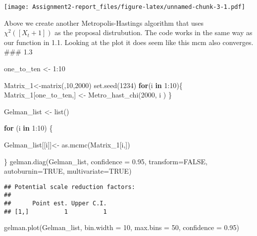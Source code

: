 \documentclass[
]{article}
\newenvironment{Shaded}{\begin{snugshade}}{\end{snugshade}}
\newcommand{\AttributeTok}[1]{\textcolor[rgb]{0.77,0.63,0.00}{#1}}
\newcommand{\ConstantTok}[1]{\textcolor[rgb]{0.00,0.00,0.00}{#1}}
\newcommand{\ControlFlowTok}[1]{\textcolor[rgb]{0.13,0.29,0.53}{\textbf{#1}}}
\newcommand{\DecValTok}[1]{\textcolor[rgb]{0.00,0.00,0.81}{#1}}
\newcommand{\FloatTok}[1]{\textcolor[rgb]{0.00,0.00,0.81}{#1}}
\newcommand{\FunctionTok}[1]{\textcolor[rgb]{0.00,0.00,0.00}{#1}}
\newcommand{\NormalTok}[1]{#1}
\newcommand{\OtherTok}[1]{\textcolor[rgb]{0.56,0.35,0.01}{#1}}
\newcommand{\SpecialCharTok}[1]{\textcolor[rgb]{0.00,0.00,0.00}{#1}}
\begin{document}
\texttt{[image: Assignment2-report\_files/figure-latex/unnamed-chunk-3-1.pdf]}

Above we create another Metropolis-Hastings algorithm that uses
\(\chi^2([X_t+1])\) as the proposal distrubution. The code works in the
same way as our function in 1.1. Looking at the plot it does seem like
this mcm also converges. \#\#\# 1.3

\begin{Shaded}
\begin{Highlighting}[]
\NormalTok{one\_to\_ten }\OtherTok{\textless{}{-}} \DecValTok{1}\SpecialCharTok{:}\DecValTok{10}

\NormalTok{Matrix\_1}\OtherTok{\textless{}{-}}\FunctionTok{matrix}\NormalTok{(,}\DecValTok{10}\NormalTok{,}\DecValTok{2000}\NormalTok{)}
\FunctionTok{set.seed}\NormalTok{(}\DecValTok{1234}\NormalTok{)}
\ControlFlowTok{for}\NormalTok{(i }\ControlFlowTok{in} \DecValTok{1}\SpecialCharTok{:}\DecValTok{10}\NormalTok{)\{}
\NormalTok{  Matrix\_1[one\_to\_ten,] }\OtherTok{\textless{}{-}} \FunctionTok{Metro\_hast\_chi}\NormalTok{(}\DecValTok{2000}\NormalTok{, i )}
\NormalTok{\}}

\NormalTok{Gelman\_list }\OtherTok{\textless{}{-}} \FunctionTok{list}\NormalTok{()}

\ControlFlowTok{for}\NormalTok{ (i }\ControlFlowTok{in} \DecValTok{1}\SpecialCharTok{:}\DecValTok{10}\NormalTok{) \{}
  
\NormalTok{  Gelman\_list[[i]]}\OtherTok{\textless{}{-}} \FunctionTok{as.mcmc}\NormalTok{(Matrix\_1[i,])}
  
\NormalTok{\}}
\FunctionTok{gelman.diag}\NormalTok{(Gelman\_list, }\AttributeTok{confidence =} \FloatTok{0.95}\NormalTok{, }\AttributeTok{transform=}\ConstantTok{FALSE}\NormalTok{, }\AttributeTok{autoburnin=}\ConstantTok{TRUE}\NormalTok{,}
            \AttributeTok{multivariate=}\ConstantTok{TRUE}\NormalTok{)}
\end{Highlighting}
\end{Shaded}

\begin{verbatim}
## Potential scale reduction factors:
## 
##      Point est. Upper C.I.
## [1,]          1          1
\end{verbatim}

\begin{Shaded}
\begin{Highlighting}[]
\FunctionTok{gelman.plot}\NormalTok{(Gelman\_list, }\AttributeTok{bin.width =} \DecValTok{10}\NormalTok{, }\AttributeTok{max.bins =} \DecValTok{50}\NormalTok{,}
            \AttributeTok{confidence =} \FloatTok{0.95}\NormalTok{)}
\end{Highlighting}
\end{Shaded}
\end{document}

